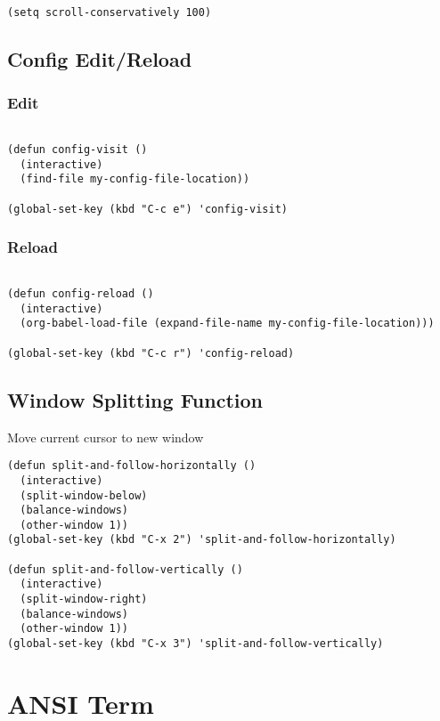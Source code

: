 \documentclass[11pt]{article}
\begin{document}
\begin{verbatim}

(setq scroll-conservatively 100)

\end{verbatim}

\subsection{Config Edit/Reload}
\label{sec:org3eba7a5}
\subsubsection{Edit}
\label{sec:org5b96ea6}
\begin{verbatim}

(defun config-visit ()
  (interactive)
  (find-file my-config-file-location))

(global-set-key (kbd "C-c e") 'config-visit)

\end{verbatim}
\subsubsection{Reload}
\label{sec:org49931cb}
\begin{verbatim}

(defun config-reload ()
  (interactive)
  (org-babel-load-file (expand-file-name my-config-file-location)))

(global-set-key (kbd "C-c r") 'config-reload)

\end{verbatim}
\subsection{Window Splitting Function}
\label{sec:orgb27e249}
Move current cursor to new window
\begin{verbatim}
(defun split-and-follow-horizontally ()
  (interactive)
  (split-window-below)
  (balance-windows)
  (other-window 1))
(global-set-key (kbd "C-x 2") 'split-and-follow-horizontally)

(defun split-and-follow-vertically ()
  (interactive)
  (split-window-right)
  (balance-windows)
  (other-window 1))
(global-set-key (kbd "C-x 3") 'split-and-follow-vertically)
\end{verbatim}
\section{ANSI Term}
\label{sec:org9e679f4}
\end{document}

